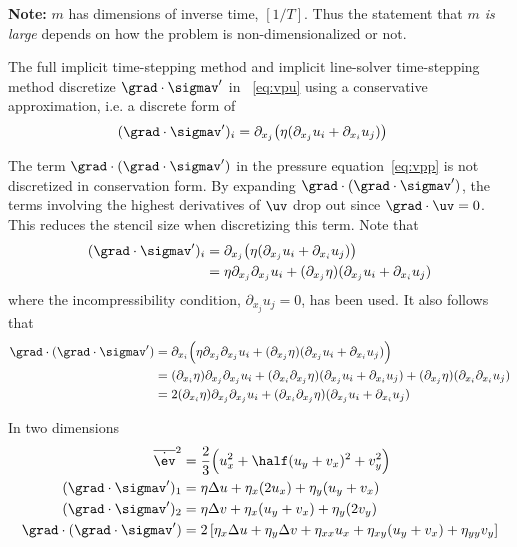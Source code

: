 {\bf Note:} $m$ has dimensions of inverse time, $[1/T]$. Thus the statement that {\em $m$ is large} depends on how
the problem is non-dimensionalized or not. 

The full implicit time-stepping method and implicit line-solver time-stepping method
discretize $\grad\cdot \sigmav'$ in ~\eqref{eq:vpu} using a conservative approximation, i.e. 
a discrete form of 
\begin{align*}
  (\grad\cdot \sigmav')_{i} &= 
     \partial_{x_j} \big( \eta ( \partial_{x_j} u_i + \partial_{x_i} u_j ) \big) 
\end{align*}


The term $\grad\cdot(\grad\cdot\sigmav')$ in the pressure equation~\eqref{eq:vpp} is not discretized
in conservation form. By expanding $\grad\cdot(\grad\cdot\sigmav')$, the terms involving the highest
derivatives of $\uv$ drop out since $\grad\cdot\uv=0$. This reduces the stencil size when discretizing
this term. 
Note that 
\begin{align*}
  (\grad\cdot \sigmav')_{i} &= 
     \partial_{x_j} \big( \eta ( \partial_{x_j} u_i + \partial_{x_i} u_j ) \big) \\
          &= \eta \partial_{x_j}\partial_{x_j} u_i + 
                  (\partial_{x_j}\eta)(\partial_{x_j} u_i + \partial_{x_i} u_j )
\end{align*}
where the incompressibility condition, $\partial_{x_j} u_j = 0$, has been used.
It also follows that
\begin{align*}
\grad\cdot(\grad\cdot \sigmav') &= 
    \partial_{x_i}\Big( \eta \partial_{x_j}\partial_{x_j} u_i + 
                  (\partial_{x_j}\eta)(\partial_{x_j} u_i + \partial_{x_i} u_j ) \Big) \\
   &= (\partial_{x_i}\eta)\partial_{x_j}\partial_{x_j} u_i +
         (\partial_{x_i}\partial_{x_j}\eta)(\partial_{x_j} u_i + \partial_{x_i} u_j )  +
         (\partial_{x_j}\eta)(\partial_{x_i}\partial_{x_i} u_j ) \\ 
   &= 2 (\partial_{x_i}\eta)\partial_{x_j}\partial_{x_j} u_i +
         (\partial_{x_i}\partial_{x_j}\eta)(\partial_{x_j} u_i + \partial_{x_i} u_j )
\end{align*}

In two dimensions
\begin{align*}
 \esr^2 &=  {2\over 3} \Big( u_x^2 +  \half( u_y + v_x )^2 + v_y^2 \Big)  \\
 (\grad\cdot \sigmav')_1 &= \eta\Delta u 
         + \eta_x(2u_x) + \eta_y(u_y+v_x) \\
 (\grad\cdot \sigmav')_2 &= \eta\Delta v 
         + \eta_x(u_y+v_x) + \eta_y(2v_y) \\
 \grad\cdot(\grad\cdot \sigmav') &= 2\left[ \eta_x\Delta u + \eta_y\Delta v +
     \eta_{xx}u_x+ \eta_{xy}(u_y+v_x) + \eta_{yy}v_y \right]
\end{align*}

